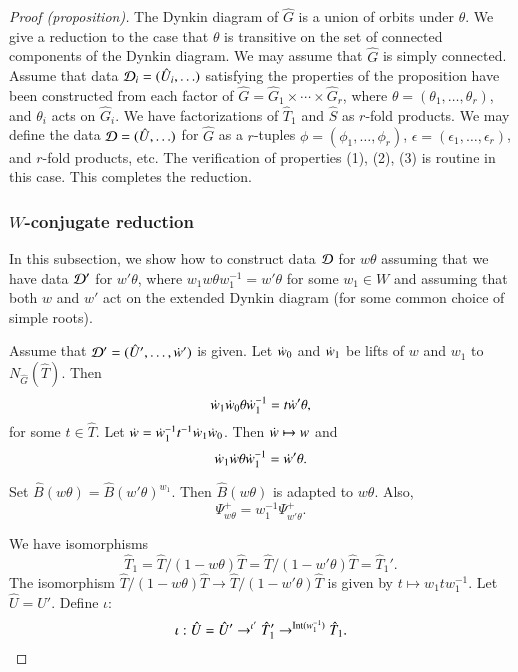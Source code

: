\begin{proof}[Proof (proposition)]
The Dynkin diagram of $\hat G$ is a union of orbits under $\theta$.
We give a reduction to the case that $\theta$ is transitive on the set
of connected components of the Dynkin diagram. We may assume that
$\hat G$ is simply connected.  Assume that data $\mathcal D_i=(\hat
U_i,\ldots)$ satisfying the properties of the proposition have been
constructed from each factor of $\hat G = \hat G_1\times\cdots\times
\hat G_r$, where $\theta=(\theta_1,\ldots,\theta_r)$, and $\theta_i$
acts on $\hat G_i$.  We have factorizations of $\hat T_1$ and $\hat S$
as $r$-fold products.  We may define the data $\mathcal D=(\hat U,\ldots)$ for
$\hat G$ as a $r$-tuples $\phi = (\phi_1,\ldots,\phi_r)$, $\epsilon =
(\epsilon_{1},\ldots,\epsilon_{r})$, and $r$-fold products, etc.  The
verification of properties (1), (2), (3) is routine in this case.
This completes the reduction.

\subsubsection{$W$-conjugate reduction}\label{sec:conjred}

In this subsection, we show how to construct data $\mathcal D$ for $w\theta$
assuming that we have data $\mathcal D'$ for $w'\theta$, where $w_1w\theta
w_1^{-1}=w'\theta$ for some $w_1\in W$ and assuming that both $w$ and
$w'$ act on the extended Dynkin diagram (for some common choice of
simple roots).

Assume that $\mathcal D' =(\hat U',\ldots,\dot w')$ is given.  Let $\dot w_0$
and $\dot w_1$ be lifts of $w$ and $w_1$ to $N_{\hat G}(\hat T)$.  Then
\[
\dot w_1 \dot w_0 \theta\dot w_1^{-1} = t \dot w'\theta,
\]
for some $t\in \hat T$.  Let $\dot w = \dot w_1^{-1} t^{-1}
\dot w_1\dot w_0$.  Then $\dot w\mapsto w$ and
\begin{equation}\label{eqn:outer}
\dot w_1\dot w \theta\dot w_1^{-1} = \dot w'\theta.
\end{equation}

Set $\hat B(w\theta) = \hat B(w'\theta)^{w_1}$.  Then $\hat
B(w\theta)$ is adapted to $w\theta$.  Also,
\[
\Psi_{w\theta}^+ = w_1^{-1}\Psi_{w'\theta}^+.
\]

We have isomorphisms
\begin{equation}
\hat T_1 = \hat T/(1-w\theta) \hat T 
= \hat T/(1-w' \theta)\hat T  = \hat T_1'.
\end{equation}
The isomorphism $\hat T/(1-w \theta)\hat T\to \hat T/(1-w'\theta)\hat
T$ is given by $t \mapsto w_1 t w_1^{-1}$.  Let $\hat U = \hat U'$.
Define $\iota$:
\[
\iota:\hat U = \hat U' \to^{\iota'} \hat T_1' \to^{{\operatorname{Int}}(w_1^{-1})} \hat T_1.
\]


\end{proof}
